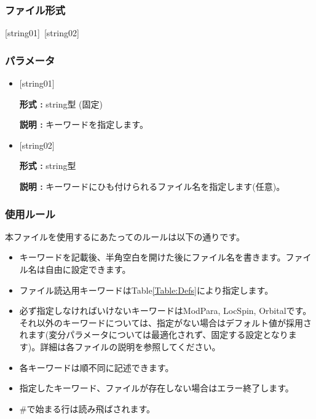 \subsubsection{ファイル形式}
[string01]~[string02]
\subsubsection{パラメータ}
 \begin{itemize}
   \item  $[$string01$]$
   
   {\bf 形式 :} string型 (固定)
   
   {\bf 説明 :} キーワードを指定します。
   
   \item  $[$string02$]$
   
    {\bf 形式 :} string型 

   {\bf 説明 :} キーワードにひも付けられるファイル名を指定します(任意)。
 \end{itemize}
\subsubsection{使用ルール}
本ファイルを使用するにあたってのルールは以下の通りです。
\begin{itemize}
\item キーワードを記載後、半角空白を開けた後にファイル名を書きます。ファイル名は自由に設定できます。
\item ファイル読込用キーワードはTable\ref{Table:Defs}により指定します。
\item 必ず指定しなければいけないキーワードはModPara, LocSpin, Orbitalです。それ以外のキーワードについては、指定がない場合はデフォルト値が採用されます(変分パラメータについては最適化されず、固定する設定となります)。詳細は各ファイルの説明を参照してください。
\item 各キーワードは順不同に記述できます。
\item 指定したキーワード、ファイルが存在しない場合はエラー終了します。
\item $\#$で始まる行は読み飛ばされます。
\end{itemize}

